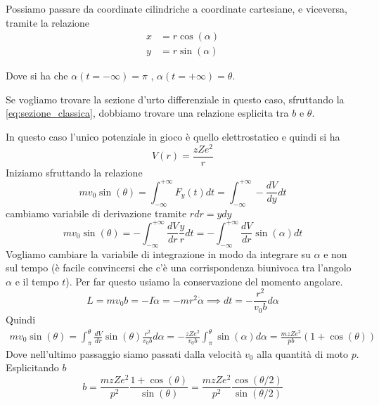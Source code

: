 Possiamo passare da coordinate cilindriche a coordinate cartesiane, e viceversa, tramite la relazione 
\begin{align}
    x &= r \cos(\alpha)\\
    y &= r \sin(\alpha)
\end{align}

Dove si ha che $\alpha(t = -\infty) = \pi$ , $\alpha (t = + \infty) = \theta$. 

Se vogliamo trovare la sezione d'urto differenziale in questo caso, sfruttando la \eqref{eq:sezione_classica}, dobbiamo trovare una relazione esplicita tra $b$ e $\theta$. 

In questo caso l'unico potenziale in gioco è quello elettrostatico e quindi si ha 
\begin{equation}
    V(r) = \frac{zZe^2}{r}
\end{equation}
Iniziamo sfruttando la relazione
\begin{equation}
    m v_0 \sin(\theta) = \int_{-\infty}^{+ \infty} F_y (t) dt = \int_{-\infty}^{+ \infty} - \frac{dV}{dy} dt
\end{equation}
cambiamo variabile di derivazione tramite $r dr = y dy$
\begin{equation*}
    m v_0 \sin(\theta) = - \int_{-\infty}^{+ \infty} \frac{dV}{dr} \frac{y}{r} dt = - \int_{-\infty}^{+ \infty} \frac{dV}{dr} \sin(\alpha) dt
\end{equation*}
Vogliamo cambiare la variabile di integrazione in modo da integrare su $\alpha$ e non sul tempo (è facile convincersi che c'è una corrispondenza biunivoca tra l'angolo $\alpha$ e il tempo $t$). Per far questo usiamo la conservazione del momento angolare. 
\begin{equation*}
    L = mv_0 b = - I \dot{\alpha} = - m r^2 \dot{\alpha} \implies dt = - \frac{r^2}{v_0 b} d\alpha
\end{equation*}
Quindi 
\begin{align*}
    m v_0 \sin(\theta) = \int_{\pi}^{\theta} \frac{dV}{dr} \sin(\theta) \frac{r^2}{v_0 b} d\alpha = - \frac{zZ e^2}{v_0 b} \int_{\pi}^{\theta} \sin(\alpha) d\alpha = \frac{mzZe^2}{p b} (1 + \cos(\theta))
\end{align*}
Dove nell'ultimo passaggio siamo passati dalla velocità $v_0$ alla quantità di moto $p$. Esplicitando $b$
\begin{equation}
    b = \frac{m zZ e^2}{p^2} \frac{1 + \cos(\theta)}{\sin(\theta)} = \frac{m zZ e^2}{p^2} \frac{\cos(\theta/2)}{\sin(\theta/2)} 
\end{equation}

